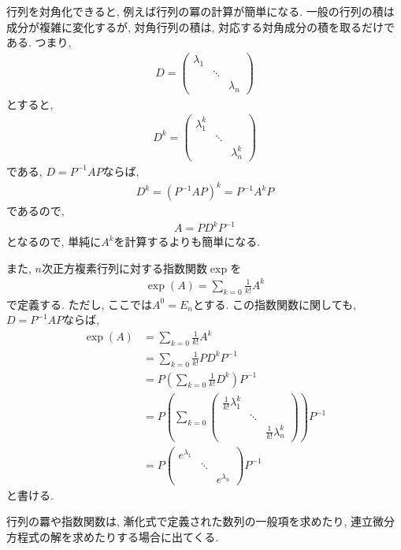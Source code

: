 行列を対角化できると,
例えば行列の冪の計算が簡単になる.
一般の行列の積は成分が複雑に変化するが,
対角行列の積は, 対応する対角成分の積を取るだけである.
つまり,
\begin{align*}
D=\begin{pmatrix}\lambda_1&&\\&\ddots&\\&&\lambda_n\end{pmatrix}
\end{align*}
とすると,
\begin{align*}
D^k=\begin{pmatrix}\lambda_1^k&&\\&\ddots&\\&&\lambda_n^k\end{pmatrix}
\end{align*}
である,
$D=P^{-1}AP$ならば,
\begin{align*}
  D^k=(P^{-1}AP)^k=P^{-1}A^kP
\end{align*}
であるので,
\begin{align*}
  A=PD^kP^{-1}
\end{align*}
となるので, 単純に$A^k$を計算するよりも簡単になる.

また, $n$次正方複素行列に対する指数関数$\exp$を
\begin{align*}
\exp(A)=\sum_{k=0}\frac{1}{k!}A^k
\end{align*}
で定義する.
ただし, ここでは$A^0=E_n$とする.
この指数関数に関しても,
$D=P^{-1}AP$ならば,
\begin{align*}
  \exp(A)&=\sum_{k=0}\frac{1}{k!}A^k\\
  &=\sum_{k=0}\frac{1}{k!}PD^kP^{-1}\\
  &=P(\sum_{k=0}\frac{1}{k!}D^k)P^{-1}\\
  &=P(\sum_{k=0}\begin{pmatrix}\frac{1}{k!}\lambda_1^k&&\\&\ddots&\\&&\frac{1}{k!}\lambda_n^k\end{pmatrix})P^{-1}\\
  &=P\begin{pmatrix}e^{\lambda_1}&&\\&\ddots&\\&&e^{\lambda_n}\end{pmatrix}P^{-1}
\end{align*}
と書ける.

\begin{remark}
  行列の羃や指数関数は,
  漸化式で定義された数列の一般項を求めたり,
  連立微分方程式の解を求めたりする場合に出てくる.
\end{remark}
